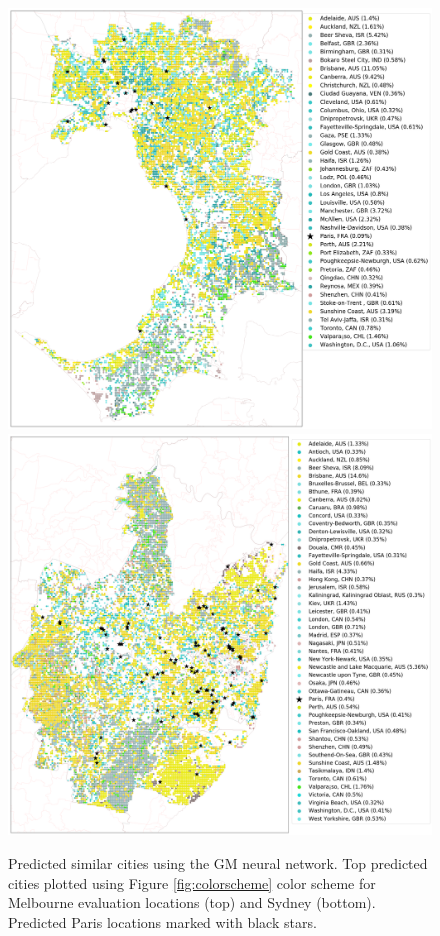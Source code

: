 \documentclass[sageh,times]{sagej}
\begin{document}
\begin{figure}[!htbp]
\centering    
\includegraphics[scale=0.16]{Images/MelbourneOverallAbrev_maps.png} 
\includegraphics[scale=0.16]{Images/SydneyOverallAbrev_maps.png}  
\caption{Predicted similar cities using the GM neural network. Top predicted cities plotted using Figure \ref{fig:colorscheme} color scheme for Melbourne evaluation locations (top) and Sydney (bottom). Predicted Paris locations marked with black stars.}    
 \label{fig:melmaps}  
\end{figure} 
\end{document}
